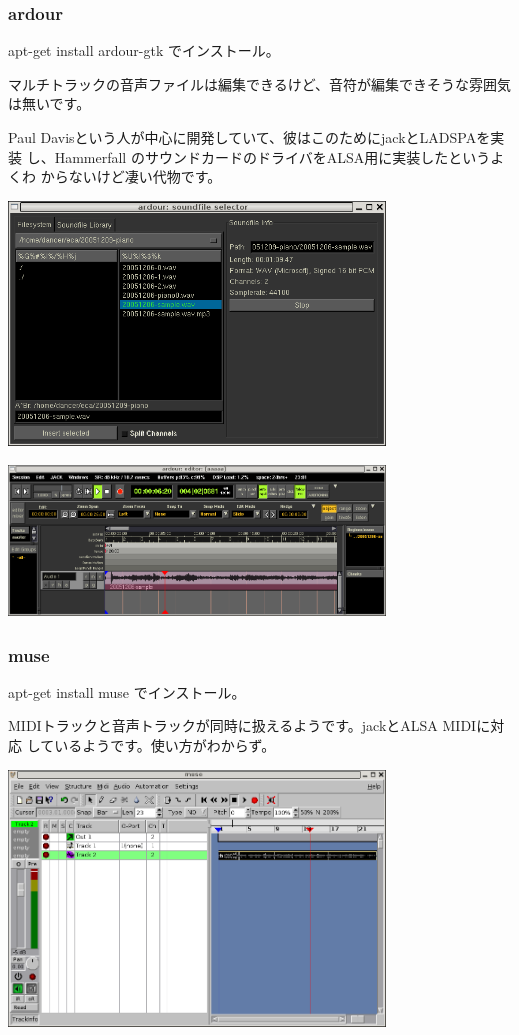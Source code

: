\documentclass[mingoth,a4paper]{jsarticle}
\begin{document}
\subsubsection{ardour}

apt-get install ardour-gtk でインストール。

マルチトラックの音声ファイルは編集できるけど、音符が編集できそうな雰囲気
は無いです。

Paul Davisという人が中心に開発していて、彼はこのためにjackとLADSPAを実装
し、Hammerfall のサウンドカードのドライバをALSA用に実装したというよくわ
からないけど凄い代物です。

\includegraphics[width=10cm]{image200602/ardour1.png}

\includegraphics[width=10cm]{image200602/ardour2.png}

\subsubsection{muse}

apt-get install muse でインストール。

MIDIトラックと音声トラックが同時に扱えるようです。jackとALSA MIDIに対応
しているようです。使い方がわからず。

\includegraphics[width=10cm]{image200602/muse.png}
\end{document}

